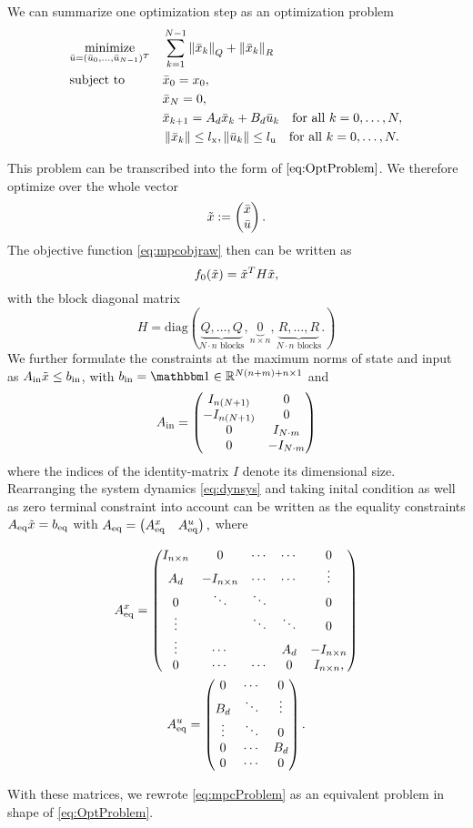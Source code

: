 We can summarize one optimization step as an optimization problem
\begin{equation}
\begin{aligned} \label{eq:mpcProblem}
& \underset{\bar{u}=(\bar{u}_0,\dots,\bar{u}_{N-1})^T}{\text{minimize}}
& & \sum_{k = 1}^{N-1} \left\lVert\bar{x}_k\right\rVert_Q + \left\lVert\bar{x}_k\right\rVert_R\\
& \text{subject to}
& & \bar{x}_0 = x_0,\\
& & &\bar{x}_N = 0,\\
& & &\bar{x}_{k+1} = A_d \bar{x}_k + B_d \bar{u}_k \text{\quad for all } k = 0,\dots,N,\\
& & &\left\lVert\bar{x}_k\right\rVert \leq {l}_{\mathrm{x}}, \left\lVert\bar{u}_k\right\rVert \leq {l}_{\mathrm{u}} \text{\quad for all } k = 0,\dots,N.
\end{aligned}
\end{equation}


This problem can be transcribed into the form of $ \eqref{eq:OptProblem} $. We therefore optimize over the whole vector \[ \tilde{x} := \begin{pmatrix} {\bar{x}} \\ {\bar{u}} \end{pmatrix}. \] The objective function \eqref{eq:mpcobjraw} then can  be written as
\[ f_0(\tilde{x}) = \tilde{x} ^T  H \tilde{x}, \] with  the block diagonal matrix \[ H = \mathrm{diag}(\underbrace{Q,\dots,Q}_{N\cdot n \text{ blocks}},\underbrace{0}_{n \times n},\underbrace{R,\dots,R}_{N \cdot n \text{ blocks}}.) \]
We further formulate the constraints at the maximum norms of state and input as $ {A}_{\mathrm{{ in}}} \tilde{x} \leq {b}_{\mathrm{{ in}}} $, with $ \bineq = \ones \in \R^{N(n+m)+n \times 1} $ and
\[ {A}_{\mathrm{{ in}}} = \begin{pmatrix}
I_{n(N+1)} & 0\\
-I_{n(N+1)} & 0\\
0 & I_{N\cdot m}\\
0 & -I_{N\cdot m}
\end{pmatrix}\]
where the indices of the identity-matrix $ I $ denote its dimensional size.
Rearranging the system dynamics \eqref{eq:dynsys} and taking inital condition as well as zero terminal constraint into account can be written as the equality constraints $ {A}_{\mathrm{eq}} \tilde{x} = {b}_{\mathrm{eq}} $ with
$ {A}_{\mathrm{eq}} =   \left( {A}_{\mathrm{eq}}^x \quad {A}_{\mathrm{eq}}^u \right), $ where

\begin{gather*}
{A}_{\mathrm{eq}}^x =  \begin{pmatrix}
I_{n\times n} & 0 & \cdots & \cdots & 0\\
A_d & -I_{n\times n} & \cdots & \cdots & \vdots\\
0 & \ddots & \ddots &  &  0\\
\vdots & & \ddots  & \ddots & 0\\
\vdots & \cdots & & A_d & -I_{n\times n}\\
0 &\cdots& \cdots & 0& I_{n\times n},
\end{pmatrix}\\
{A}_{\mathrm{eq}}^u = \begin{pmatrix}
0 & \cdots & 0\\
B_d &\ddots &\vdots\\
\vdots &\ddots & 0\\
0 & \cdots & B_d\\
0 & \cdots & 0
\end{pmatrix}.
\end{gather*}

With these matrices, we rewrote \eqref{eq:mpcProblem} as an equivalent problem in shape of  \eqref{eq:OptProblem}.